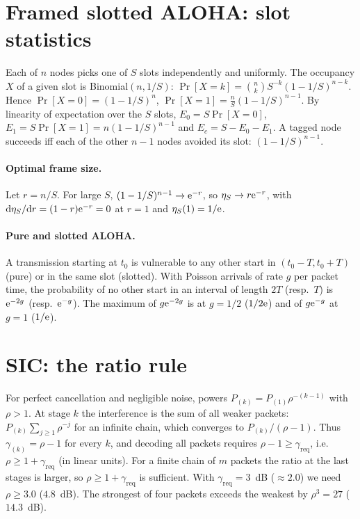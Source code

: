 \section{Framed slotted ALOHA: slot statistics}
\label{app:fsa}

Each of $n$ nodes picks one of $S$ slots independently and uniformly. The occupancy $X$ of a given slot is Binomial$(n,1/S)$:
$\Pr[X=k]=\binom nk S^{-k}(1-1/S)^{n-k}$. Hence
$\Pr[X=0]=(1-1/S)^n$, $\Pr[X=1]=\frac nS(1-1/S)^{n-1}$. By linearity of expectation over the $S$ slots, $E_0=S\Pr[X=0]$, $E_1=S\Pr[X=1]=n(1-1/S)^{n-1}$ and $E_c=S-E_0-E_1$. A tagged node succeeds iff each of the other $n-1$ nodes avoided its slot: $(1-1/S)^{n-1}$.

\paragraph{Optimal frame size.} Let $r=n/S$. For large $S$, $(1-1/S)^{n-1}\to\mathrm{e}^{-r}$, so $\eta_S\to r\mathrm{e}^{-r}$, with $\mathrm d\eta_S/\mathrm dr=(1-r)\mathrm{e}^{-r}=0$ at $r=1$ and $\eta_S(1)=1/\mathrm{e}$.

\paragraph{Pure and slotted ALOHA.} A transmission starting at $t_0$ is vulnerable to any other start in $(t_0-T,t_0+T)$ (pure) or in the same slot (slotted). With Poisson arrivals of rate $g$ per packet time, the probability of no other start in an interval of length $2T$ (resp.\ $T$) is $\mathrm{e}^{-2g}$ (resp.\ $\mathrm{e}^{-g}$). The maximum of $g\mathrm{e}^{-2g}$ is at $g=1/2$ ($1/2\mathrm{e}$) and of $g\mathrm{e}^{-g}$ at $g=1$ ($1/\mathrm{e}$).

\section{SIC: the ratio rule}
\label{app:sicratio}

For perfect cancellation and negligible noise, powers $P_{(k)}=P_{(1)}\rho^{-(k-1)}$ with $\rho>1$. At stage $k$ the interference is the sum of all weaker packets: $P_{(k)}\sum_{j\ge1}\rho^{-j}$ for an infinite chain, which converges to $P_{(k)}/(\rho-1)$. Thus $\gamma_{(k)}=\rho-1$ for every $k$, and decoding all packets requires $\rho-1\ge\gamma_{\mathrm{req}}$, i.e.\ $\rho\ge1+\gamma_{\mathrm{req}}$ (in linear units). For a finite chain of $m$ packets the ratio at the last stages is larger, so $\rho\ge1+\gamma_{\mathrm{req}}$ is sufficient. With $\gamma_{\mathrm{req}}=3$~dB ($\approx2.0$) we need $\rho\ge3.0$ ($4.8$~dB). The strongest of four packets exceeds the weakest by $\rho^{3}=27$ ($14.3$~dB).

